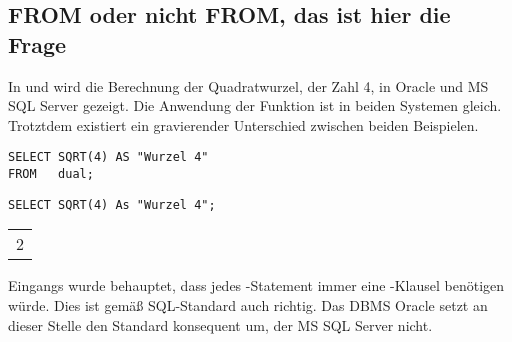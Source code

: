       \subsection{FROM oder nicht FROM, das ist hier die Frage}
        In  und  wird die Berechnung der
        Quadratwurzel, der Zahl 4, in Oracle und MS SQL Server gezeigt. Die
        Anwendung der Funktion  ist in beiden Systemen
        gleich. Trotztdem existiert ein gravierender Unterschied zwischen beiden
        Beispielen.
        \begin{lstlisting}[language=oracle_sql,caption={Berechnung der Quadartwurzel, der Zahl 4, in Oracle},label=sql03_12]
SELECT SQRT(4) AS "Wurzel 4"
FROM   dual;
        \end{lstlisting}
\clearpage
        \begin{lstlisting}[language=ms_sql,caption={Berechnung der Quadratwurzel, der Zahl 4, in MS SQL Server},label=sql03_13]
SELECT SQRT(4) As "Wurzel 4";
        \end{lstlisting}
        \begin{center}
          \begin{small}
            \tablehead{}
            \begin{msoraclesql}
              \begin{supertabular}{r}
                2 \\
              \end{supertabular}
            \end{msoraclesql}
          \end{small}
        \end{center}
        Eingangs wurde behauptet, dass jedes \SELECT-Statement immer eine
        \FROM-Klausel benötigen würde. Dies ist gemäß SQL-Standard
        auch richtig. Das DBMS Oracle setzt an dieser Stelle den Standard
        konsequent um, der MS SQL Server nicht.


